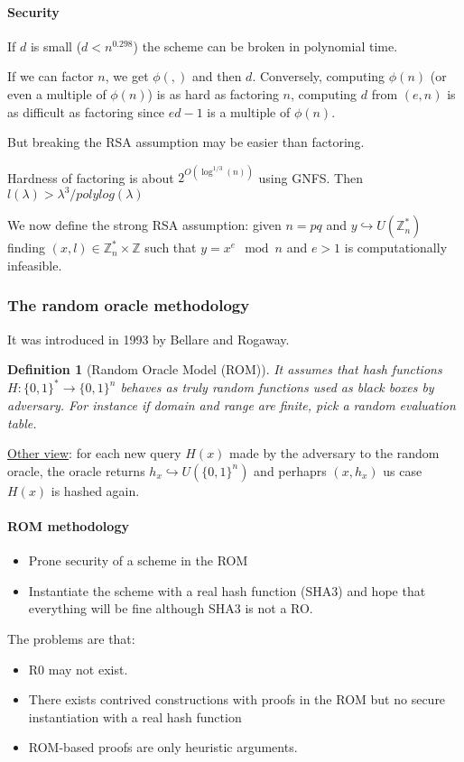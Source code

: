 \documentclass{article}
\newtheorem{defi}[thm]{Definition}
\newcommand{\Def}[3]{\begin{defi}[#1]\label{#2}#3\end{defi}}
\newcommand{\Z}{\mathbb{Z}}
\newcommand{\bit}{\{0,1\}}
\begin{document}
\paragraph{Security} If $d$ is small ($d<n^{0.298}$) the scheme can be broken in polynomial time. 

If we can factor $n$, we get $\phi(,)$ and then $d$. Conversely, computing $\phi(n)$ (or even a multiple of $\phi(n)$) is as hard as factoring $n$, computing $d$ from $(e,n)$ is as difficult as factoring since $ed-1$ is a multiple of $\phi(n)$.

But breaking the RSA assumption may be easier than factoring.

Hardness of factoring is about $2^{O(\log^{1/3}(n))}$ using GNFS. Then $l(\lambda)>\lambda^3/polylog(\lambda)$

We now define the strong RSA assumption: given $n=pq$ and $y\hookrightarrow U(\Z_n^*)$ finding $(x,l)\in\Z_n^*\times\Z$ such that $y=x^e\mod{n}$ and $e>1$ is computationally infeasible.

\subsubsection{The random oracle methodology}
It was introduced in 1993 by Bellare and Rogaway.

\Def{Random Oracle Model (ROM)}{}{It assumes that hash functions $H:\bit^*\rightarrow\bit^n$ behaves as truly random functions used as black boxes by adversary. For instance if domain and range are finite, pick a random evaluation table.}

\underline{Other view}: for each new query $H(x)$ made by the adversary to the random oracle, the oracle returns $h_x\hookrightarrow U(\bit^n)$ and perhaprs $(x,h_x)$ us case $H(x)$ is hashed again.

\paragraph{ROM methodology}
\begin{itemize}
\item Prone security of a scheme in the ROM
\item Instantiate the scheme with a real hash function (SHA3) and hope that everything will be fine although SHA3 is not a RO.
\end{itemize}

The problems are that:\begin{itemize}
\item R0 may not exist.
\item There exists contrived constructions with proofs in the ROM but no secure instantiation with a real hash function
\item ROM-based proofs are only heuristic arguments.
\end{itemize}
\end{document}
